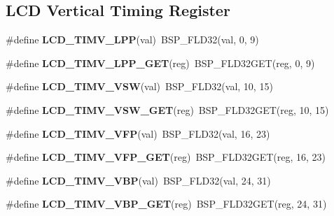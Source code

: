 \subsection*{L\+CD Vertical Timing Register}
\begin{DoxyCompactItemize}
\item 
\mbox{\label{group__lpc__lcd_ga248a77dbae60a7fec3e795b609f3e503}} 
\#define {\bfseries L\+C\+D\+\_\+\+T\+I\+M\+V\+\_\+\+L\+PP}(val)~B\+S\+P\+\_\+\+F\+L\+D32(val, 0, 9)
\item 
\mbox{\label{group__lpc__lcd_ga82c0eb2b34265f5bb3152b2eab412b3d}} 
\#define {\bfseries L\+C\+D\+\_\+\+T\+I\+M\+V\+\_\+\+L\+P\+P\+\_\+\+G\+ET}(reg)~B\+S\+P\+\_\+\+F\+L\+D32\+G\+ET(reg, 0, 9)
\item 
\mbox{\label{group__lpc__lcd_gae133f232a2a3ad7fc4ba0623f675ce7c}} 
\#define {\bfseries L\+C\+D\+\_\+\+T\+I\+M\+V\+\_\+\+V\+SW}(val)~B\+S\+P\+\_\+\+F\+L\+D32(val, 10, 15)
\item 
\mbox{\label{group__lpc__lcd_ga4899eb6e839b78afd3b5fc76db2fbb38}} 
\#define {\bfseries L\+C\+D\+\_\+\+T\+I\+M\+V\+\_\+\+V\+S\+W\+\_\+\+G\+ET}(reg)~B\+S\+P\+\_\+\+F\+L\+D32\+G\+ET(reg, 10, 15)
\item 
\mbox{\label{group__lpc__lcd_ga83e69d38616a653c11bf18eb3e134314}} 
\#define {\bfseries L\+C\+D\+\_\+\+T\+I\+M\+V\+\_\+\+V\+FP}(val)~B\+S\+P\+\_\+\+F\+L\+D32(val, 16, 23)
\item 
\mbox{\label{group__lpc__lcd_gac7561642e6c025de1d064babf7428bc4}} 
\#define {\bfseries L\+C\+D\+\_\+\+T\+I\+M\+V\+\_\+\+V\+F\+P\+\_\+\+G\+ET}(reg)~B\+S\+P\+\_\+\+F\+L\+D32\+G\+ET(reg, 16, 23)
\item 
\mbox{\label{group__lpc__lcd_ga8101be95340f508dc091a7414a0b3f53}} 
\#define {\bfseries L\+C\+D\+\_\+\+T\+I\+M\+V\+\_\+\+V\+BP}(val)~B\+S\+P\+\_\+\+F\+L\+D32(val, 24, 31)
\item 
\mbox{\label{group__lpc__lcd_gae9d5e99e0395251b418f22ba105f555a}} 
\#define {\bfseries L\+C\+D\+\_\+\+T\+I\+M\+V\+\_\+\+V\+B\+P\+\_\+\+G\+ET}(reg)~B\+S\+P\+\_\+\+F\+L\+D32\+G\+ET(reg, 24, 31)
\end{DoxyCompactItemize}
